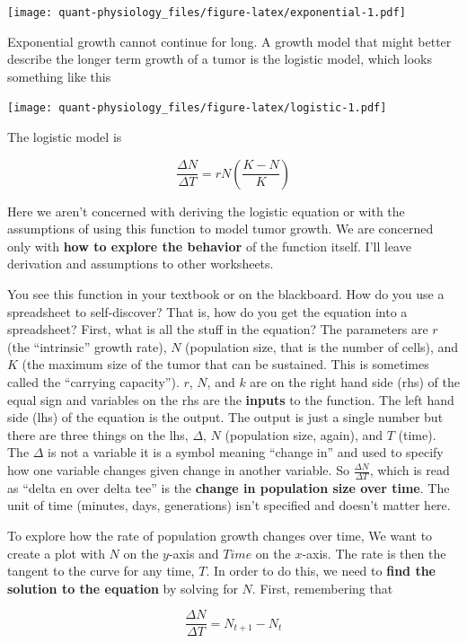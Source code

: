 \documentclass[]{book}
\begin{document}
\texttt{[image: quant-physiology\_files/figure-latex/exponential-1.pdf]}

Exponential growth cannot continue for long. A growth model that might
better describe the longer term growth of a tumor is the logistic model,
which looks something like this

\texttt{[image: quant-physiology\_files/figure-latex/logistic-1.pdf]}

The logistic model is

\begin{equation}
\frac{\Delta N}{\Delta T} = rN(\frac{K-N}{K})
\end{equation}

Here we aren't concerned with deriving the logistic equation or with the
assumptions of using this function to model tumor growth. We are
concerned only with \textbf{how to explore the behavior} of the function
itself. I'll leave derivation and assumptions to other worksheets.

You see this function in your textbook or on the blackboard. How do you
use a spreadsheet to self-discover? That is, how do you get the equation
into a spreadsheet? First, what is all the stuff in the equation? The
parameters are \(r\) (the ``intrinsic'' growth rate), \(N\) (population
size, that is the number of cells), and \(K\) (the maximum size of the
tumor that can be sustained. This is sometimes called the ``carrying
capacity''). \(r\), \(N\), and \(k\) are on the right hand side (rhs) of
the equal sign and variables on the rhs are the \textbf{inputs} to the
function. The left hand side (lhs) of the equation is the output. The
output is just a single number but there are three things on the lhs,
\(\Delta\), \(N\) (population size, again), and \(T\) (time). The
\(\Delta\) is not a variable it is a symbol meaning ``change in'' and
used to specify how one variable changes given change in another
variable. So \(\frac{\Delta N}{\Delta T}\), which is read as ``delta en
over delta tee'' is the \textbf{change in population size over time}.
The unit of time (minutes, days, generations) isn't specified and
doesn't matter here.

To explore how the rate of population growth changes over time, We want
to create a plot with \(N\) on the \(y\)-axis and \(Time\) on the
\(x\)-axis. The rate is then the tangent to the curve for any time,
\(T\). In order to do this, we need to \textbf{find the solution to the
equation} by solving for \(N\). First, remembering that

\begin{equation}
\frac{\Delta N}{\Delta T} = N_{t+1} - N_t
\end{equation}
\end{document}

